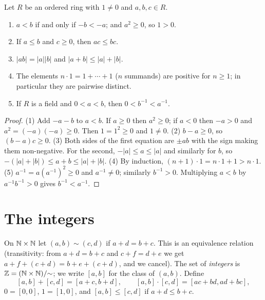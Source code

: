 \begin{lemma}\label{number-systems:lemma-ordered-field}
Let $R$ be an ordered ring with $1 \neq 0$ and $a, b, c \in R$.
\begin{enumerate}
\item $a < b$ if and only if $-b < -a$; and $a^2 \geq 0$, so $1 > 0$.
\item If $a \leq b$ and $c \geq 0$, then $ac \leq bc$.
\item $|ab| = |a||b|$ and $|a + b| \leq |a| + |b|$.
\item The elements $n \cdot 1 = 1 + \cdots + 1$ ($n$ summands) are positive for
$n \geq 1$; in particular they are pairwise distinct.
\item If $R$ is a field and $0 < a < b$, then $0 < b^{-1} < a^{-1}$.
\end{enumerate}
\end{lemma}

\begin{proof}
(1) Add $-a - b$ to $a < b$. If $a \geq 0$ then $a^2 \geq 0$; if $a < 0$ then
$-a > 0$ and $a^2 = (-a)(-a) \geq 0$. Then $1 = 1^2 \geq 0$ and $1 \neq 0$.
(2) $b - a \geq 0$, so $(b - a)c \geq 0$.
(3) Both sides of the first equation are $\pm ab$ with the sign making them
non-negative. For the second, $-|a| \leq a \leq |a|$ and similarly for $b$, so
$-(|a| + |b|) \leq a + b \leq |a| + |b|$.
(4) By induction, $(n + 1) \cdot 1 = n \cdot 1 + 1 > n \cdot 1$.
(5) $a^{-1} = a (a^{-1})^2 \geq 0$ and $a^{-1} \neq 0$; similarly $b^{-1} > 0$.
Multiplying $a < b$ by $a^{-1} b^{-1} > 0$ gives $b^{-1} < a^{-1}$.
\end{proof}

\section{The integers}\label{number-systems:section-integers}

\begin{definition}\label{number-systems:definition-integers}
On $\mathbb{N} \times \mathbb{N}$ let $(a, b) \sim (c, d)$ if $a + d = b + c$. This is an
equivalence relation (transitivity: from $a + d = b + c$ and $c + f = d + e$ we
get $a + f + (c + d) = b + e + (c + d)$, and we cancel). The set of
\emph{integers} is $\mathbb{Z} = (\mathbb{N} \times \mathbb{N})/{\sim}$; we write $[a, b]$ for the
class of $(a, b)$. Define
\[
[a, b] + [c, d] = [a + c, b + d], \qquad
[a, b] \cdot [c, d] = [ac + bd, ad + bc],
\]
$0 = [0, 0]$, $1 = [1, 0]$, and $[a, b] \leq [c, d]$ if $a + d \leq b + c$.
\end{definition}

